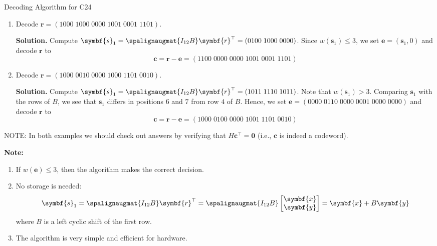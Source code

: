\begin{Example}{Decoding Algorithm for C24}{}
    \begin{enumerate}
        \item Decode $ \symbf{r}=(1000\; 1000\; 0000\; 1001\; 0001\; 1101) $.

              \textbf{Solution.} Compute $ \symbf{s}_1=\spalignaugmat{I_{12} B}\symbf{r}^\top=
                  (0100\; 1000\; 0000) $. Since $ w(\symbf{s}_1)\leqslant 3 $, we set
              $ \symbf{e}=(\symbf{s}_1,0) $ and decode $ \symbf{r} $ to
              \[ \symbf{c}=\symbf{r}-\symbf{e}=(1100\; 0000\; 0000\; 1001\; 0001\; 1101) \]

        \item Decode $ \symbf{r}=(1000\; 0010\; 0000\; 1000\; 1101\; 0010) $.

              \textbf{Solution.} Compute $ \symbf{s}_1=\spalignaugmat{I_{12} B}\symbf{r}^\top=
                  (1011\; 1110\; 1011) $. Note that $ w(\symbf{s}_1)>3 $. Comparing $ \symbf{s}_1 $
              with the rows of $ B $, we see that $ \symbf{s}_1 $ differs in positions $ 6 $
              and $ 7 $ from row $ 4 $ of $ B $. Hence, we set $ \symbf{e}=(0000\; 0110\; 0000\; 0001\; 0000\; 0000) $
              and decode $ \symbf{r} $ to
              \[ \symbf{c}=\symbf{r}-\symbf{e}=(1000\; 0100\; 0000\; 1001\; 1101\; 0010) \]
    \end{enumerate}

    NOTE\@: In both examples we should check out answers by verifying that $ H\symbf{c}^\top=\symbf{0} $
    (i.e., $ \symbf{c} $ is indeed a codeword).
\end{Example}


\textbf{Note:}
\begin{enumerate}[label=(\arabic*)]
    \item If $ w(\symbf{e})\leqslant 3 $, then the algorithm makes the correct decision.
    \item No storage is needed:
          \[ \symbf{s}_1=\spalignaugmat{I_{12} B}\symbf{r}^\top=\spalignaugmat{I_{12} B}
              \begin{bmatrix}
                  \symbf{x} \\
                  \symbf{y}
              \end{bmatrix}=\symbf{x}+B\symbf{y} \]
          where $ B $ is a left cyclic shift of the first row.
    \item The algorithm is very simple and efficient for hardware.
\end{enumerate}

